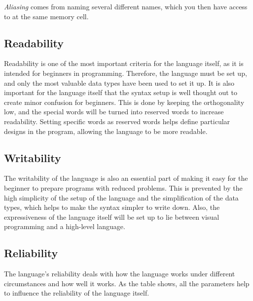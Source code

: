 \textit{Aliasing} comes from naming several different names, which you then have access to at the same memory cell.




\subsection{Readability}
Readability is one of the most important criteria for the language itself, as it is intended for beginners in programming. 
Therefore, the language must be set up, and only the most valuable data types have been used to set it up. It is also important for the language itself that the syntax setup is well thought out to create minor confusion for beginners.
 This is done by keeping the orthogonality low, and the special words will be turned into reserved words to increase readability. 
Setting specific words as reserved words helps define particular designs in the program, allowing the language to be more readable.

\subsection{Writability}

The writability of the language is also an essential part of making it easy for the beginner to prepare programs with reduced problems. 
This is prevented by the high simplicity of the setup of the language and the simplification of the data types, which helps to make the syntax simpler to write down.
 Also, the expressiveness of the language itself will be set up to lie between visual programming and a high-level language.

 \subsection{Reliability}
 The language's reliability deals with how the language works under different circumstances and how well it works. 
 As the table shows, all the parameters help to influence the reliability of the language itself.
